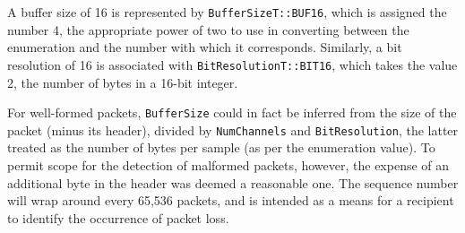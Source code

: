 \noindent
A buffer size of 16 is represented by \texttt{BufferSizeT::BUF16},
which is assigned the number 4, the appropriate power of two to use in
converting between the enumeration and the number with which it corresponds.
Similarly, a bit resolution of 16 is associated with
\texttt{BitResolutionT::BIT16}, which takes the value 2, the number of
bytes in a 16-bit integer.

For well-formed packets, \texttt{BufferSize} could in fact
be inferred from the size of the packet (minus its header), divided by
\texttt{NumChannels} and \texttt{BitResolution}, the latter
treated as the number of bytes per sample (as per the enumeration value).
To permit scope for the detection of malformed packets, however, the expense
of an additional byte in the header was deemed a reasonable one.
The sequence number will wrap around every 65,536 packets, and is intended as
a means for a recipient to identify the occurrence of packet loss.

